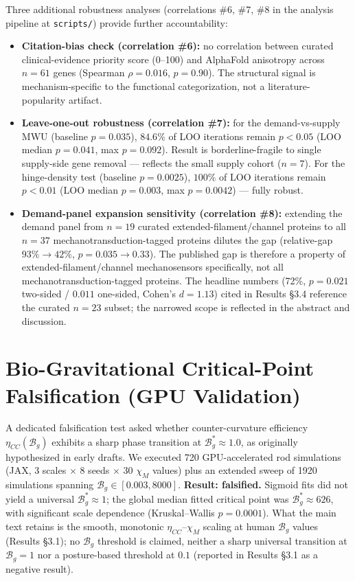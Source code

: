 Three additional robustness analyses (correlations \#6, \#7, \#8 in the analysis pipeline at \texttt{scripts/}) provide further accountability:

\begin{itemize}
\item \textbf{Citation-bias check (correlation \#6):} no correlation between curated clinical-evidence priority score (0--100) and AlphaFold anisotropy across $n=61$ genes (Spearman $\rho = 0.016$, $p = 0.90$). The structural signal is mechanism-specific to the functional categorization, not a literature-popularity artifact.
\item \textbf{Leave-one-out robustness (correlation \#7):} for the demand-vs-supply MWU (baseline $p = 0.035$), $84.6\%$ of LOO iterations remain $p < 0.05$ (LOO median $p = 0.041$, max $p = 0.092$). Result is borderline-fragile to single supply-side gene removal --- reflects the small supply cohort ($n = 7$). For the hinge-density test (baseline $p = 0.0025$), $100\%$ of LOO iterations remain $p < 0.01$ (LOO median $p = 0.003$, max $p = 0.0042$) --- fully robust.
\item \textbf{Demand-panel expansion sensitivity (correlation \#8):} extending the demand panel from $n=19$ curated extended-filament/channel proteins to all $n=37$ mechanotransduction-tagged proteins dilutes the gap (relative-gap $93\% \rightarrow 42\%$, $p = 0.035 \rightarrow 0.33$). The published gap is therefore a property of extended-filament/channel mechanosensors specifically, not all mechanotransduction-tagged proteins. The headline numbers (72\%, $p = 0.021$ two-sided / $0.011$ one-sided, Cohen's $d = 1.13$) cited in Results §3.4 reference the curated $n = 23$ subset; the narrowed scope is reflected in the abstract and discussion.
\end{itemize}

\section{Bio-Gravitational Critical-Point Falsification (GPU Validation)}

A dedicated falsification test asked whether counter-curvature efficiency $\eta_{CC}(\mathcal{B}_g)$ exhibits a sharp phase transition at $\mathcal{B}_g^* \approx 1.0$, as originally hypothesized in early drafts. We executed 720 GPU-accelerated rod simulations (JAX, 3 scales $\times$ 8 seeds $\times$ 30 $\chi_M$ values) plus an extended sweep of 1920 simulations spanning $\mathcal{B}_g \in [0.003, 8000]$. \textbf{Result: falsified.} Sigmoid fits did not yield a universal $\mathcal{B}_g^* \approx 1$; the global median fitted critical point was $\mathcal{B}_g^* \approx 626$, with significant scale dependence (Kruskal--Wallis $p = 0.0001$). What the main text retains is the smooth, monotonic $\eta_{CC}$--$\chi_M$ scaling at human $\mathcal{B}_g$ values (Results §3.1); no $\mathcal{B}_g$ threshold is claimed, neither a sharp universal transition at $\mathcal{B}_g = 1$ nor a posture-based threshold at $0.1$ (reported in Results §3.1 as a negative result).
